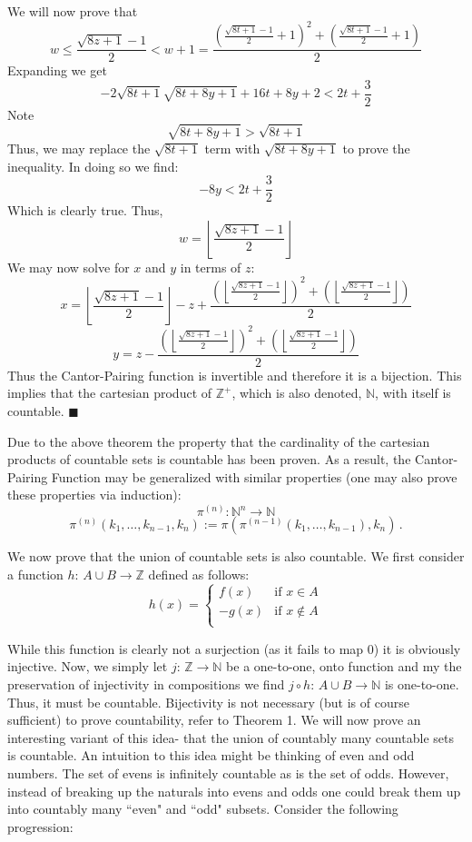 \documentclass{article}
\begin{document}
We will now prove that 
\[
w \leq \frac{\sqrt{8z+1}-1}{2} < w+1=\frac{(\frac{\sqrt{8t+1}-1}{2}+1)^2+(\frac{\sqrt{8t+1}-1}{2}+1)}{2}
\]
Expanding we get
\[
-2\sqrt{8t+1}\sqrt{8t+8y+1}+16t+8y+2 < 2t+\frac{3}{2}
\]
Note
\[
\sqrt{8t+8y+1}>\sqrt{8t+1}
\]
Thus, we may replace the $\sqrt{8t+1}$ term with $\sqrt{8t+8y+1}$ to prove the inequality. In doing so we find:
\[
-8y<2t+\frac{3}{2}
\]
Which is clearly true. Thus,
\[
w=\left \lfloor{\frac{\sqrt{8z+1}-1}{2}}\right \rfloor
\]
We may now solve for $x$ and $y$ in terms of $z$:
\[
x=\left \lfloor{\frac{\sqrt{8z+1}-1}{2}}\right \rfloor - z + \frac{(\left \lfloor{\frac{\sqrt{8z+1}-1}{2}}\right \rfloor)^2+(\left \lfloor{\frac{\sqrt{8z+1}-1}{2}}\right \rfloor)}{2}
\]
\[
y=z - \frac{(\left \lfloor{\frac{\sqrt{8z+1}-1}{2}}\right \rfloor)^2+(\left \lfloor{\frac{\sqrt{8z+1}-1}{2}}\right \rfloor)}{2}
\]
Thus the Cantor-Pairing function is invertible and therefore it is a bijection. This implies that the cartesian product of $\mathbb{Z}^{+}$, which is also denoted, $\mathbb{N}$, with itself is countable.
{$\blacksquare$}
\par Due to the above theorem the property that the cardinality of the cartesian products of countable sets is countable has been proven. As a result, the Cantor-Pairing Function may be generalized with similar properties (one may also prove these properties via induction):
\[
\pi ^{{(n)}}:{\mathbb  {N}}^{n}\to {\mathbb  {N}}
\]
\[
\pi ^{{(n)}}(k_{1},\ldots ,k_{{n-1}},k_{n}):=\pi (\pi ^{{(n-1)}}(k_{1},\ldots ,k_{{n-1}}),k_{n})\,.
\]
\par We now prove that the union of countable sets is also countable. We first consider a function $h$: $A \cup B \to \mathbb{Z}$ defined as follows:
\[h(x) =
	\begin{cases} 
      f(x) & \text{if } x \in A \\
      -g(x) & \text{if } x \not\in A \\
   \end{cases}
\]
\par While this function is clearly not a surjection (as it fails to map 0) it is obviously injective. Now, we simply let $j$: $\mathbb{Z} \to \mathbb{N}$ be a one-to-one, onto function and my the preservation of injectivity in compositions we find $j \circ h$: $A \cup B \to \mathbb{N}$ is one-to-one. Thus, it must be countable. Bijectivity is not necessary (but is of course sufficient) to prove countability, refer to Theorem 1. We will now prove an interesting variant of this idea- that the union of countably many countable sets is countable. An intuition to this idea might be thinking of even and odd numbers. The set of evens is infinitely countable as is the set of odds. However, instead of breaking up the naturals into evens and odds one could break them up into countably many ``even" and ``odd" subsets. Consider the following progression:
\end{document}
